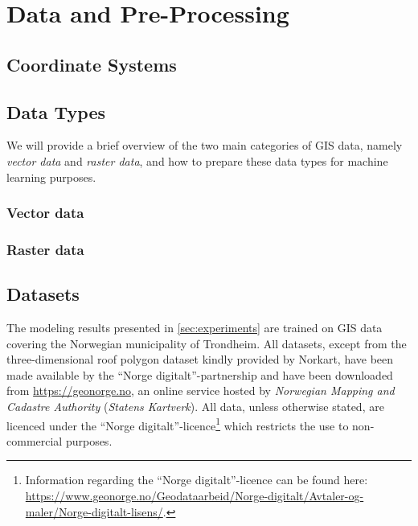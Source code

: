 \chapter{Data and Pre-Processing}%
\label{sec:data}



\section{Coordinate Systems}%
\label{sec:coordinate-systems}


\section{Data Types}%
\label{sec:data-types}

We will provide a brief overview of the two main categories of GIS data, namely \textit{vector data} and \textit{raster data}, and how to prepare these data types for machine learning purposes.

\subsection{Vector data}%
\label{sec:vector-data}


\subsection{Raster data}%
\label{sec:raster-data}


\section{Datasets}%
\label{sec:data-sets}

The modeling results presented in \cref{sec:experiments} are trained on GIS data covering the Norwegian municipality of Trondheim.
All datasets, except from the three-dimensional roof polygon dataset kindly provided by Norkart, have been made available by the \enquote{Norge digitalt}-partnership and have been downloaded from \url{https://geonorge.no}, an online service hosted by \textit{Norwegian Mapping and Cadastre Authority} (\textit{Statens Kartverk}).
All data, unless otherwise stated, are licenced under the \enquote{Norge digitalt}-licence\footnote{Information regarding the \enquote{Norge digitalt}-licence can be found here: \url{https://www.geonorge.no/Geodataarbeid/Norge-digitalt/Avtaler-og-maler/Norge-digitalt-lisens/}.} which restricts the use to non-commercial purposes.

